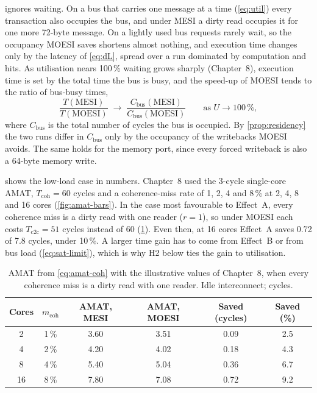  ignores waiting. On a bus that carries one message at a time
(\cref{eq:util}) every transaction also occupies the bus, and under MESI a dirty
read occupies it for one more 72-byte message. On a lightly used bus requests rarely
wait, so the occupancy MOESI saves shortens almost nothing, and execution time
changes only by the latency of \cref{eq:dL}, spread over a run dominated by
computation and hits. As utilisation nears 100\,\% waiting grows sharply
(Chapter~8), execution time is set by the total time the bus is busy, and the
speed-up of MOESI tends to the ratio of bus-busy times,
\begin{equation}
  \frac{T(\mathrm{MESI})}{T(\mathrm{MOESI})} \;\longrightarrow\;
  \frac{C_{\mathrm{bus}}(\mathrm{MESI})}{C_{\mathrm{bus}}(\mathrm{MOESI})}
  \qquad\text{as } U \to 100\,\%,
  \label{eq:sat-limit}
\end{equation}
where $C_{\mathrm{bus}}$ is the total number of cycles the bus is occupied. By
\cref{prop:residency} the two runs differ in $C_{\mathrm{bus}}$ only by the
occupancy of the writebacks MOESI avoids. The same holds for the memory port, since
every forced writeback is also a 64-byte memory write.

 shows the low-load case in numbers. Chapter~8 used the 3-cycle
single-core AMAT, $T_{\mathrm{coh}}=60$ cycles and a coherence-miss rate of 1, 2, 4
and 8\,\% at 2, 4, 8 and 16 cores (\cref{fig:amat-bars}). In the case most
favourable to Effect~A, every coherence miss is a dirty read with one reader
($r=1$), so under MOESI each costs $T_{\mathrm{c2c}}=51$ cycles instead of 60
(\cref{tab:amat-compare}). Even then, at 16 cores Effect~A saves 0.72 of 7.8 cycles,
under 10\,\%. A larger time gain has to come from Effect~B or from bus load
(\cref{eq:sat-limit}), which is why H2 below ties the gain to utilisation.

\begin{table}[htbp]
\centering
\caption{AMAT from \cref{eq:amat-coh} with the illustrative values of Chapter~8,
when every coherence miss is a dirty read with one reader. Idle interconnect;
cycles.}
\label{tab:amat-compare}
\small
\begin{tabular}{@{}c c c c c c@{}}
\toprule
Cores & $m_{\mathrm{coh}}$ & AMAT, MESI & AMAT, MOESI & Saved (cycles) & Saved (\%) \\
\midrule
2  & 1\,\% & 3.60 & 3.51 & 0.09 & 2.5 \\
4  & 2\,\% & 4.20 & 4.02 & 0.18 & 4.3 \\
8  & 4\,\% & 5.40 & 5.04 & 0.36 & 6.7 \\
16 & 8\,\% & 7.80 & 7.08 & 0.72 & 9.2 \\
\bottomrule
\end{tabular}
\end{table}

